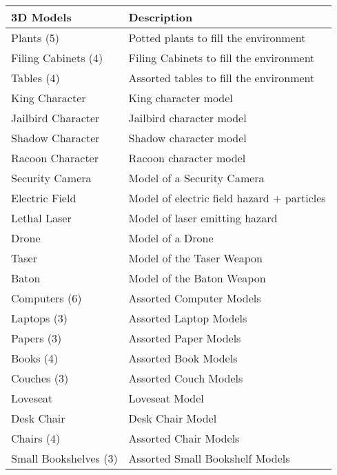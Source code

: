\documentclass[10pt]{report}
\begin{document}
\begin{center}
    \begin{tabular}{| p{.45\linewidth} | p{.45\linewidth} |}
        \hline    
        \textbf{3D Models}   & \textbf{Description}  \\ \hline
        Plants (5)  &        Potted plants to fill the environment\\ \hline
        Filing Cabinets (4) &        Filing Cabinets to fill the environment\\ \hline
        Tables (4)  &        Assorted tables to fill the environment\\ \hline
        King Character  &        King character model\\ \hline
        Jailbird Character  &        Jailbird character model\\ \hline
        Shadow Character    &        Shadow character model\\ \hline
        Racoon Character    &        Racoon character model\\ \hline
        Security Camera &        Model of a Security Camera    \\ \hline
        Electric Field  &        Model of electric field hazard + particles\\ \hline
        Lethal Laser    &        Model of laser emitting hazard\\ \hline
        Drone   &     Model of a Drone       \\ \hline
        Taser   &     Model of the Taser Weapon       \\ \hline
        Baton   &     Model of the Baton Weapon       \\ \hline
        Computers (6)   &    Assorted Computer Models        \\ \hline
        Laptops (3) &  Assorted Laptop Models          \\ \hline
        Papers (3)  &  Assorted Paper Models          \\ \hline
        Books (4)   &  Assorted Book Models          \\ \hline
        Couches (3)  &  Assorted Couch Models          \\ \hline
        Loveseat    &  Loveseat Model          \\ \hline
        Desk Chair  &  Desk Chair Model          \\ \hline
        Chairs (4)  &  Assorted Chair Models          \\ \hline
        Small Bookshelves (3)   &    Assorted Small Bookshelf Models        \\ \hline

\end{tabular}
\end{center}
\end{document}
